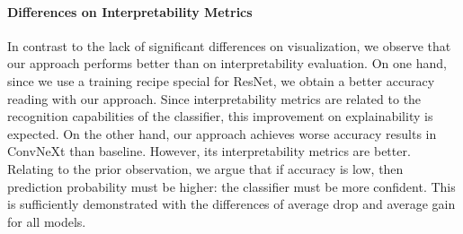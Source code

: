 \paragraph{Differences on Interpretability Metrics} In contrast to the lack of significant 
differences on visualization, we observe that our approach performs better than \gap 
on interpretability evaluation. On one hand, since we use a training recipe special for ResNet, we 
obtain a better accuracy reading with our approach. Since interpretability metrics are related to 
the recognition capabilities of the classifier, this improvement on explainability is expected. On 
the other hand, our approach achieves worse accuracy results in ConvNeXt than baseline. However, 
its interpretability metrics are better. Relating to the prior observation, we argue that if 
accuracy is low, then prediction probability must be higher: the classifier must be more confident. 
This is sufficiently demonstrated with the differences of average drop and average gain for all models.
